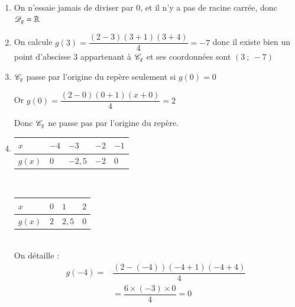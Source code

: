 \documentclass[oneside,12pt]{exam}          %
\begin{document}
\begin{minipage}{0.5\textwidth} \restoreskip
	\begin{enumerate}
		\item On n'essaie jamais de diviser par $0$, et il n'y a pas de racine carrée, donc ${\mathscr{D}}_g = {\mathbb R}$
		\item On calcule $g(3) = \dfrac{(2-3)(3+1)(3+4)}{4} = -7$ \quad donc il existe bien un point d'abscisse $3$ appartenant à ${\mathscr{C}}_g$ et ses coordonnées sont $(3 ~;~ -7)$
		\item ${\mathscr{C}}_g$ passe par l'origine du repère seulement si $g(0) = 0$
		
		Or $g(0) = \dfrac{(2 - 0)(0 + 1)(x + 0)}{4} = 2$
		
		Donc ${\mathscr{C}}_g$ ne passe pas par l'origine du repère.
		\item		
		\renewcommand{\arraystretch}{1.5}
		\begin{tabular}{| P{1.5cm} | P{1cm} | P{1cm} | P{1cm} | P{1cm} |} \hline
			$x$ & $-4$ & $-3$ & $-2$ & $-1$  \\ \hline
			$g(x)$ & $0$ & $-2,5$ & $-2$ & $0$ \\ \hline
		\end{tabular}\\
		\begin{tabular}{| P{1.5cm} | P{1cm} | P{1cm} | P{1cm} |} \hline
			$x$ & $0$ & $1$ & $2$  \\ \hline
			$g(x)$ & $2$ & $2,5$ & $0$ \\ \hline
		\end{tabular} \\
		
		On détaille : 
		\begin{align*}
			g(-4) = & \dfrac{(2 - (-4) )(-4 + 1)(-4 + 4)}{4} \\
			& = \dfrac{6 \times (-3) \times 0}{4} = 0
		\end{align*}
	\end{enumerate}
\end{minipage}
\begin{minipage}{0.5\textwidth}
\end{minipage}
\end{document}
